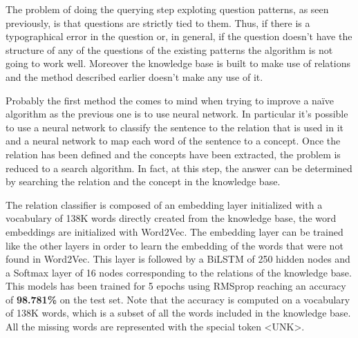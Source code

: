 \documentclass[paper=a4, fontsize=11pt]{scrartcl} %
\numberwithin{equation}{section} %
\numberwithin{figure}{section} %
\numberwithin{table}{section} %
\theoremstyle{definition}
\begin{document}
The problem of doing the querying step exploting question patterns, as seen
previously, is that
questions are strictly tied to them. Thus, if there is a typographical error in
the question or, in general, if the question doesn't have the structure of any
of the questions of the existing patterns the algorithm is not going to work
well. Moreover the knowledge base is built to make use of relations and the
method described earlier doesn't make any use of it.

Probably the first method the comes to mind when trying to improve a na\"ive
algorithm as the previous one is to use neural network. In particular it's
possible to use a neural network to classify the sentence to the relation that
is used in it and a neural network to map each word of the sentence to a concept.
Once the relation has been defined and the concepts have been extracted, the
problem is reduced to a search algorithm. In fact, at this step, the answer
can be determined by searching the relation and the concept in the knowledge
base.

The relation classifier is composed of an embedding layer initialized with
a vocabulary of 138K words directly created from the knowledge base, the word
embeddings are initialized with Word2Vec. The embedding layer can be trained
like the other layers in order to learn the embedding of the words that were
not found in Word2Vec. This layer is followed by a BiLSTM of 250 hidden nodes
and a Softmax layer of 16 nodes corresponding to the relations of the
knowledge base. This models has been trained for 5 epochs using RMSprop
reaching an accuracy of \textbf{98.781\%} on the test set. Note that the accuracy is computed on a vocabulary
of 138K words, which is a subset of all the words included in the knowledge
base. All the missing words are represented with the special token <UNK>.
\end{document}
